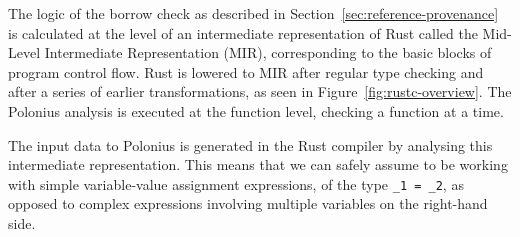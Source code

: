 \documentclass[11pt,a4paper,twoside,openany]{report}
\newcommand{\InRust}[1]{\texttt{#1}}
\begin{document}
The logic of the borrow check as described in
Section~\ref{sec:reference-provenance} is calculated at the level of an
intermediate representation of Rust called the Mid-Level Intermediate
Representation (MIR), corresponding to the basic blocks of program control flow.
Rust is lowered to MIR after regular type checking and after a series of earlier
transformations, as seen in Figure~\ref{fig:rustc-overview}. The Polonius
analysis is executed at the function level, checking a function at a time.

The input data to Polonius is generated in the Rust compiler by analysing this
intermediate representation. This means that we can safely assume to be working
with simple variable-value assignment expressions, of the type \InRust{_1 = _2},
as opposed to complex expressions involving multiple variables on the right-hand
side.
\end{document}
